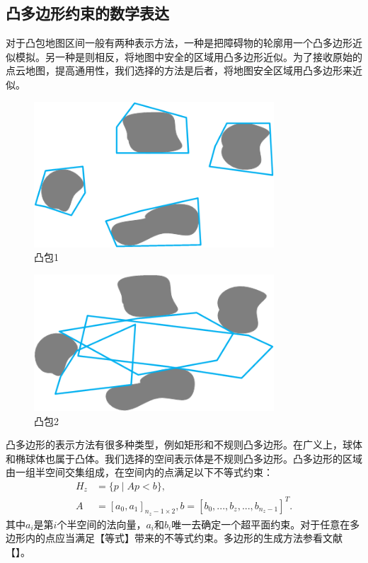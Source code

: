 \documentclass[master,academic]{ysuthesis} %
\begin{document}
		\subsection{凸多边形约束的数学表达}
		对于凸包地图区间一般有两种表示方法，一种是把障碍物的轮廓用一个凸多边形近似模拟。另一种是则相反，将地图中安全的区域用凸多边形近似。为了接收原始的点云地图，提高通用性，我们选择的方法是后者，将地图安全区域用凸多边形来近似。
		\begin{figure}[!ht]
			\centering
			\includegraphics[width=0.8\textwidth]{凸包1.png}
			\caption{凸包1}
			\label{fig:凸包1}
		\end{figure}
		\begin{figure}[!ht]
			\centering
			\includegraphics[width=0.8\textwidth]{凸包2.png}
			\caption{凸包2}
			\label{fig:凸包2}
		\end{figure}
		凸多边形的表示方法有很多种类型，例如矩形和不规则凸多边形。在广义上，球体和椭球体也属于凸体。我们选择的空间表示体是不规则凸多边形。凸多边形的区域由一组半空间交集组成，在空间内的点满足以下不等式约束：
		\begin{equation}
			\begin{aligned}
				H_z&=\{p\mid Ap<b\},\\
				A&=\left[ a_0,a_1 \right] _{n_z-1\times 2},b=\left[ b_0,...,b_z,...,b_{n_z-1} \right] ^T.
			\end{aligned}
		\end{equation}
		其中$a_i$是第$i$个半空间的法向量，$a_i$和$b_i$唯一去确定一个超平面约束。对于任意在多边形内的点应当满足【等式】带来的不等式约束。多边形的生成方法参看文献【】。
	
\end{document}
